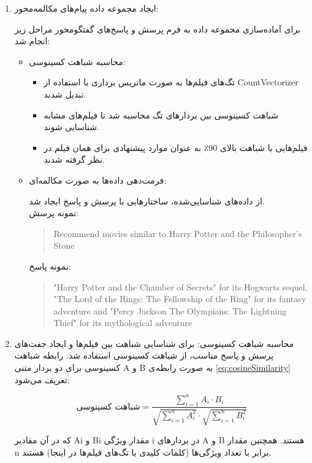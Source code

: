 \begin{enumerate}
\item
ایجاد مجموعه داده پیام‌های مکالمه‌محور:

برای آماده‌سازی مجموعه داده به فرم پرسش و پاسخ‌های گفتگو‌محور مراحل زیر انجام شد:
\begin{itemize}
\item
محاسبه شباهت کسینوسی:
\begin{itemize}
\item
تگ‌های فیلم‌ها به صورت ماتریس برداری با استفاده از CountVectorizer تبدیل شدند.
\item
شباهت کسینوسی بین بردارهای تگ محاسبه شد تا فیلم‌های مشابه شناسایی شوند.
\item
فیلم‌هایی با شباهت بالای 90٪ به عنوان موارد پیشنهادی برای همان فیلم در نظر گرفته شدند.
\end{itemize}

\item
فرمت‌دهی داده‌ها به صورت مکالمه‌ای:

از داده‌های شناسایی‌شده، ساختارهایی با پرسش و پاسخ ایجاد شد.\\
نمونه پرسش:
\begin{quote}
\begin{LTR}
Recommend movies similar to Harry Potter and the Philosopher's Stone
\end{LTR}
\end{quote}
نمونه پاسخ:
\begin{quote}
\begin{LTR}
"Harry Potter and the Chamber of Secrets" for its Hogwarts sequel, "The Lord of the Rings: The Fellowship of the Ring" for its fantasy adventure and "Percy Jackson The Olympians: The Lightning Thief" for its mythological adventure
\end{LTR}
\end{quote}
\end{itemize}

\item
محاسبه شباهت کسینوسی:
برای شناسایی شباهت بین فیلم‌ها و ایجاد جفت‌های پرسش و پاسخ مناسب، از شباهت کسینوسی استفاده شد. رابطه شباهت کسینوسی برای دو بردار متنی A و B به صورت رابطه ی %
\ref{eq:cosineSimilarity}
 تعریف می‌شود:

 
\begin{equation}
\label{eq:cosineSimilarity}
\text{شباهت کسینوسی} = \frac{\sum_{i=1}^{n} A_i \cdot B_i}{\sqrt{\sum_{i=1}^{n} A_i^2} \cdot \sqrt{\sum_{i=1}^{n} B_i^2}}
\end{equation}


که در آن مقادیر Ai​ و Bi​ مقدار ویژگی i در بردارهای A و B هستند. همچنین مقدار n برابر با تعداد ویژگی‌ها (کلمات کلیدی یا تگ‌های فیلم‌ها در اینجا) هستند.


\end{enumerate}
